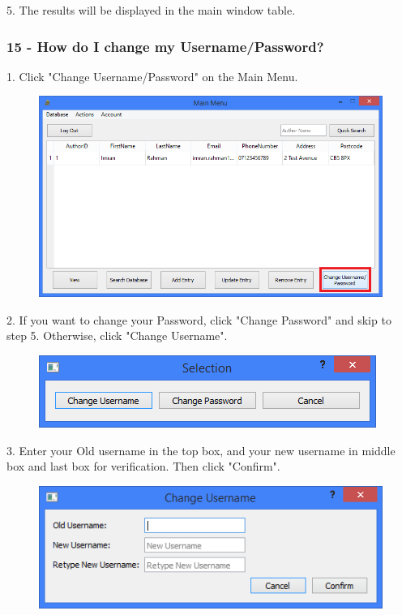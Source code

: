 5. The results will be displayed in the main window table.

\subsubsection{15 - How do I change my Username/Password?}

1. Click "Change Username/Password" on the Main Menu.

\begin{figure}[H]
    \includegraphics[width=\textwidth]{./Manual/Tutorial/Q15/ChangeUsernameOrPassword.png}
\end{figure}

2. If you want to change your Password, click "Change Password" and skip to step 5. Otherwise, click "Change Username".

\begin{figure}[H]
    \includegraphics[width=\textwidth]{./Manual/Tutorial/Q15/Selection.png}
\end{figure}

3. Enter your Old username in the top box, and your new username in middle box and last box for verification. Then click "Confirm".

\begin{figure}[H]
    \includegraphics[width=\textwidth]{./Manual/Tutorial/Q15/ChangeUsername.png}
\end{figure}

